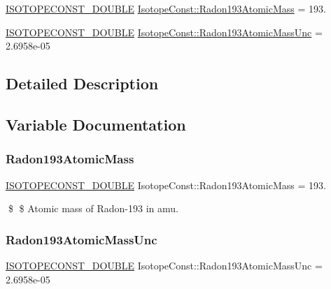 \begin{DoxyCompactItemize}
\item 
\mbox{\hyperlink{group___isotope_const-_macros_ga8f45a7272ce02c0b4c65c44636ed719a}{I\+S\+O\+T\+O\+P\+E\+C\+O\+N\+S\+T\+\_\+\+D\+O\+U\+B\+LE}} \mbox{\hyperlink{group___isotope_const-_radon-_rn193_gab258521523eaeb4980aaa4d4cec66f30}{Isotope\+Const\+::\+Radon193\+Atomic\+Mass}} = 193.
\item 
\mbox{\hyperlink{group___isotope_const-_macros_ga8f45a7272ce02c0b4c65c44636ed719a}{I\+S\+O\+T\+O\+P\+E\+C\+O\+N\+S\+T\+\_\+\+D\+O\+U\+B\+LE}} \mbox{\hyperlink{group___isotope_const-_radon-_rn193_ga37bd49abab13af930c4f273c372f75af}{Isotope\+Const\+::\+Radon193\+Atomic\+Mass\+Unc}} = 2.\+6958e-\/05
\end{DoxyCompactItemize}


\subsection{Detailed Description}


\subsection{Variable Documentation}
\mbox{\label{group___isotope_const-_radon-_rn193_gab258521523eaeb4980aaa4d4cec66f30}} 
\subsubsection{\texorpdfstring{Radon193\+Atomic\+Mass}{Radon193AtomicMass}}
{\footnotesize\ttfamily \mbox{\hyperlink{group___isotope_const-_macros_ga8f45a7272ce02c0b4c65c44636ed719a}{I\+S\+O\+T\+O\+P\+E\+C\+O\+N\+S\+T\+\_\+\+D\+O\+U\+B\+LE}} Isotope\+Const\+::\+Radon193\+Atomic\+Mass = 193.}

\$ \$ Atomic mass of Radon-\/193 in amu. \mbox{\label{group___isotope_const-_radon-_rn193_ga37bd49abab13af930c4f273c372f75af}} 
\subsubsection{\texorpdfstring{Radon193\+Atomic\+Mass\+Unc}{Radon193AtomicMassUnc}}
{\footnotesize\ttfamily \mbox{\hyperlink{group___isotope_const-_macros_ga8f45a7272ce02c0b4c65c44636ed719a}{I\+S\+O\+T\+O\+P\+E\+C\+O\+N\+S\+T\+\_\+\+D\+O\+U\+B\+LE}} Isotope\+Const\+::\+Radon193\+Atomic\+Mass\+Unc = 2.\+6958e-\/05}

